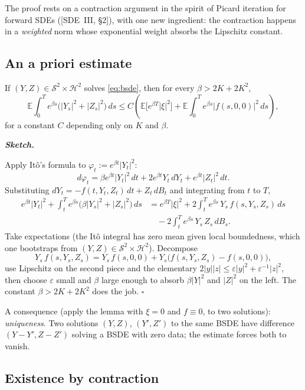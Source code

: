 \documentclass{article}
\newenvironment{proof}[1][Proof]{%
  \par\smallskip\noindent\textit{\textbf{#1.}}\quad\ignorespaces
}{%
  \hfill$\square$\par\smallskip
}
\newcommand{\E}{\mathbb{E}}
\newcommand{\Sc}{\mathcal{S}}
\newcommand{\Hc}{\mathcal{H}}
\begin{document}
The proof rests on a contraction argument in the spirit of Picard iteration for forward SDEs ([SDE~III, \S2]), with one new ingredient: the contraction happens in a \emph{weighted} norm whose exponential weight absorbs the Lipschitz constant.

\subsection{An a priori estimate}

\begin{lemma}\label{lem:apriori}
If $(Y, Z) \in \Sc^2 \times \Hc^2$ solves \eqref{eq:bsde}, then for every $\beta > 2K + 2K^2$,
\[
  \E\!\int_0^T e^{\beta s}\big(|Y_s|^2 + |Z_s|^2\big)\,ds \le C \!\left( \E\big[ e^{\beta T}|\xi|^2 \big] + \E\!\int_0^T e^{\beta s}|f(s, 0, 0)|^2\, ds \right),
\]
for a constant $C$ depending only on $K$ and $\beta$.
\end{lemma}

\begin{proof}[Sketch]
Apply It\^o's formula to $\varphi_t := e^{\beta t} |Y_t|^2$:
\[
  d\varphi_t = \beta e^{\beta t}|Y_t|^2\,dt + 2 e^{\beta t} Y_t\,dY_t + e^{\beta t} |Z_t|^2\,dt.
\]
Substituting $dY_t = -f(t, Y_t, Z_t)\,dt + Z_t\,dB_t$ and integrating from $t$ to $T$,
\begin{align*}
  e^{\beta t}|Y_t|^2 + \int_t^T e^{\beta s}\big(\beta |Y_s|^2 + |Z_s|^2\big)\,ds
  &= e^{\beta T}|\xi|^2 + 2\int_t^T e^{\beta s}\, Y_s\, f(s, Y_s, Z_s)\,ds \\
  &\quad - 2\int_t^T e^{\beta s}\, Y_s\, Z_s\, dB_s.
\end{align*}
Take expectations (the It\^o integral has zero mean given local boundedness, which one bootstraps from $(Y, Z) \in \Sc^2 \times \Hc^2$). Decompose
\[
  Y_s\, f(s, Y_s, Z_s) = Y_s\, f(s, 0, 0) + Y_s\big(f(s, Y_s, Z_s) - f(s, 0, 0)\big),
\]
use Lipschitz on the second piece and the elementary $2|y||z| \le \varepsilon|y|^2 + \varepsilon^{-1}|z|^2$, then choose $\varepsilon$ small and $\beta$ large enough to absorb $\beta|Y|^2$ and $|Z|^2$ on the left. The constant $\beta > 2K + 2K^2$ does the job.
\end{proof}

A consequence (apply the lemma with $\xi = 0$ and $f \equiv 0$, to two solutions): \emph{uniqueness}. Two solutions $(Y, Z)$, $(Y', Z')$ to the same BSDE have difference $(Y - Y', Z - Z')$ solving a BSDE with zero data; the estimate forces both to vanish.

\subsection{Existence by contraction}
\end{document}
